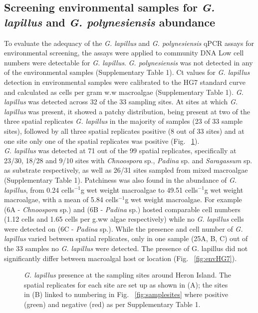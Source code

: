 \documentclass[12pt]{article}
\begin{document}
\subsection*{Screening environmental samples for \emph{G. lapillus} and \emph{G. polynesiensis} abundance}
To evaluate the adequacy of the \emph{G. lapillus} and \emph{G. polynesiensis} qPCR assays for environmental screening, the assays were applied to community DNA Low cell numbers were detectable for \emph{G. lapillus}. \emph{G. polynesiensis} was not detected in any of the environmental samples (Supplementary Table 1).
Ct values for \emph{G. lapillus} detection in environmental samples were calibrated to the HG7 standard curve and calculated as cells per gram w.w macroalgae (Supplementary Table 1). 
\emph{G. lapillus} was detected across 32 of the 33 sampling sites. At sites at which \textit{G. lapillus} was present, it showed a patchy distribution, being present at two of the three spatial replicates \emph{G. lapillus} in the majority of samples (23 of 33 sample sites), followed by all three spatial replicates positive (8 out of 33 sites) and at one site only one of the spatial replicates was positive (Fig. ~\ref{fig:envposneg}). \\
\emph{G. lapillus} was detected at 71 out of the 99 spatial replicates, specifically at 23/30, 18/28 and 9/10 sites with \emph{Chnoospora} sp., \emph{Padina} sp. and \emph{Saragassum} sp. as substrate respectively, as well as 26/31 sites sampled from mixed macroalgae (Supplementary Table 1).
Patchiness was also found in the abundance of 
\emph{G. lapillus}, from 0.24 cells$^{-1}$g wet weight macroalgae to 49.51 cells$^{-1}$g wet weight macroalgae, with a mean of 5.84 cells$^{-1}$g wet weight macroalgae. For example (6A - \emph{Chnoospora} sp.) and (6B - \emph{Padina} sp.) hosted comparable cell numbers (1.12 cells and 1.65 cells per g.ww algae respectively) while no \emph{G. lapillus} cells were detected on (6C - \emph{Padina} sp.). While the presence and cell number of \emph{G. lapillus} varied between spatial replicates, only in one sample (25A, B, C) out of the 33 samples no \emph{G. lapillus} were detected. The presence of G. lapillus did not significantly differ between macroalgal host or location (Fig. ~\ref{fig:envHG7}). 

\FloatBarrier 
\begin{figure} 
\caption{\emph{G. lapillus} presence at the sampling sites around Heron Island. The spatial replicates for each site are set up as shown in (A); the sites in (B) linked to numbering in Fig. ~\ref{fig:samplesites} where positive (green) and negative (red) as per Supplementary Table 1.} 
\label{fig:envposneg}
\end{figure} 
\FloatBarrier
\end{document}
